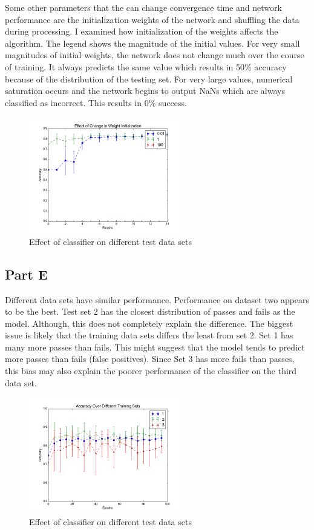 Some other parameters that the can change convergence time and network performance are the initialization weights of the network and shuffling the data during processing.  I examined how initialization of the weights affects the algorithm.  The legend shows the magnitude of the initial values.  For very small magnitudes of initial weights, the network does not change much over the course of training.  It always predicts the same value which results in 50\% accuracy because of the distribution of the testing set.  For very large values, numerical saturation occurs and the network begins to output NaNs which are always classified as incorrect.  This results in 0\% success.  
\begin{figure}[h]
	\centering
	\includegraphics[width=0.6\textwidth]{../train1/weights.png}
	\caption{Effect of classifier on different test data sets}
\end{figure}


\subsection{Part E}
Different data sets have similar performance.  Performance on dataset two appears to be the best.  Test set 2 has the closest distribution of passes and fails as the model.  Although, this does not completely explain the difference.  The biggest issue is likely that the training data sets differs the least from set 2.  Set 1 has many more passes than fails.  This might suggest that the model tends to predict more passes than fails (false positives).  Since Set 3 has more fails than passes, this bias may also explain the poorer performance of the classifier on the third data set.
\begin{figure}[h]
	\centering
	\includegraphics[width=0.6\textwidth]{../train1/data_sets.png}
	\caption{Effect of classifier on different test data sets}
\end{figure}